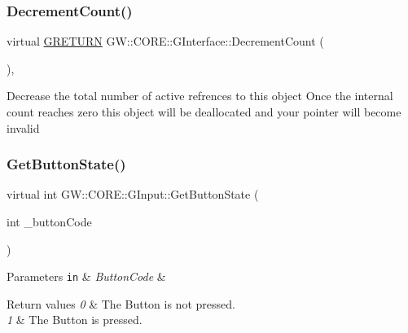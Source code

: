\subsubsection{\texorpdfstring{Decrement\+Count()}{DecrementCount()}}
{\footnotesize\ttfamily virtual \hyperlink{namespace_g_w_a69b1aaebac1cac8049825f035884c95b}{G\+R\+E\+T\+U\+RN} G\+W\+::\+C\+O\+R\+E\+::\+G\+Interface\+::\+Decrement\+Count (\begin{DoxyParamCaption}{ }\end{DoxyParamCaption})\hspace{0.3cm}{\ttfamily [pure virtual]}, {\ttfamily [inherited]}}

Decrease the total number of active refrences to this object Once the internal count reaches zero this object will be deallocated and your pointer will become invalid \hypertarget{class_g_w_1_1_c_o_r_e_1_1_g_input_a22770ecd4e65ac105f362da351a953e9}{}\label{class_g_w_1_1_c_o_r_e_1_1_g_input_a22770ecd4e65ac105f362da351a953e9} 
\subsubsection{\texorpdfstring{Get\+Button\+State()}{GetButtonState()}}
{\footnotesize\ttfamily virtual int G\+W\+::\+C\+O\+R\+E\+::\+G\+Input\+::\+Get\+Button\+State (\begin{DoxyParamCaption}\item[{int}]{\+\_\+button\+Code }\end{DoxyParamCaption})\hspace{0.3cm}{\ttfamily [pure virtual]}}


\begin{DoxyParams}[1]{Parameters}
\mbox{\tt in}  & {\em Button\+Code} & \\
\hline
\end{DoxyParams}

\begin{DoxyRetVals}{Return values}
{\em 0} & The Button is not pressed. \\
\hline
{\em 1} & The Button is pressed. \\
\hline
\end{DoxyRetVals}
\hypertarget{class_g_w_1_1_c_o_r_e_1_1_g_input_ab634a00fa9e5a12142bf6d50c112a0b3}{}\label{class_g_w_1_1_c_o_r_e_1_1_g_input_ab634a00fa9e5a12142bf6d50c112a0b3} 
